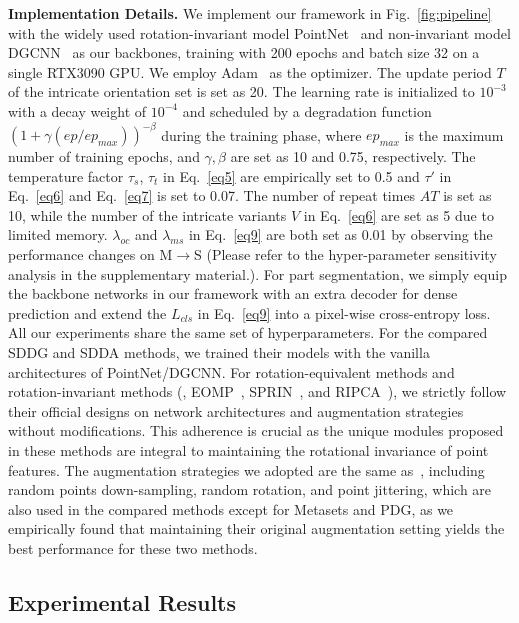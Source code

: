 \noindent\textbf{Implementation Details.}
We implement our framework in Fig.~\ref{fig:pipeline} with the widely used rotation-invariant model PointNet~\cite{qi2017pointnet} and non-invariant model DGCNN~\cite{wang2019dynamic} as our backbones, training with 200 epochs and batch size 32 on a single RTX3090 GPU. We employ Adam~\cite{kingma2014adam} as the optimizer. The update period $T$ of the intricate orientation set is set as 20. The learning rate is initialized to $10^{-3}$ with a decay weight of $10^{-4}$ and scheduled by a degradation function $(1 + \gamma (ep/ep_{max}))^{-\beta}$ during the training phase, where $ep_{max}$ is the maximum number of training epochs, and $\gamma, \beta$ are set as 10 and 0.75, respectively. The temperature factor $\tau_s$, $\tau_t$ in Eq.~\ref{eq5} are empirically set to 0.5 and $\tau'$ in Eq.~\ref{eq6} and Eq.~\ref{eq7} is set to 0.07. 
The number of repeat times $AT$ is set as 10, while the number of the intricate variants $V$ in Eq.~\ref{eq6} are set as 5 due to limited memory. $\lambda_{oc}$ and $\lambda_{ms}$ in Eq.~\ref{eq9} are both set as 0.01 by observing the performance changes on M$\to$S (Please refer to the hyper-parameter sensitivity analysis in the supplementary material.). For part segmentation, we simply equip the backbone networks in our framework with an extra decoder for dense prediction and extend the $L_{cls}$ in Eq.~\ref{eq9} into a pixel-wise cross-entropy loss. All our experiments share the same set of hyperparameters. 
For the compared SDDG and SDDA methods, we trained their models with the vanilla architectures of PointNet/DGCNN. For rotation-equivalent methods and rotation-invariant methods (\eg, EOMP~\cite{luo2022equivariant}, SPRIN~\cite{you2021prin}, and RIPCA~\cite{li2021closer}), we strictly follow their official designs on network architectures and augmentation strategies without modifications. This adherence is crucial as the unique modules proposed in these methods are integral to maintaining the rotational invariance of point features.
The augmentation strategies we adopted are the same as~\cite{qin2019pointdan}, including random points down-sampling, random rotation, and point jittering, which are also used in the compared methods except for Metasets and PDG, as we empirically found that maintaining their original augmentation setting yields the best performance for these two methods. 



\vspace{-2mm}
\subsection{Experimental Results}

